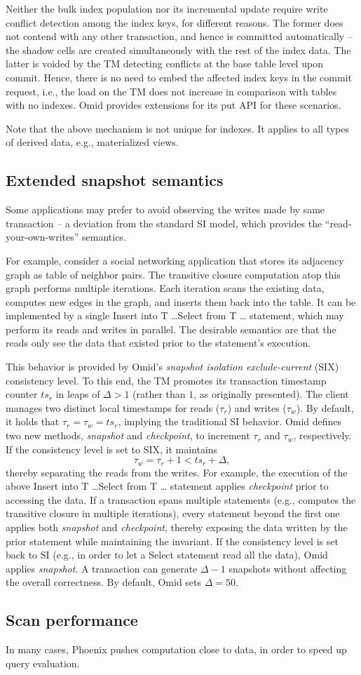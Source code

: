 Neither the bulk index population nor its incremental update require write conflict detection 
among the index keys, for different reasons. The former does not contend with any other 
transaction, and hence is committed automatically -- the shadow cells are created simultaneously
with the rest of the index data. The latter is voided by the TM detecting conflicts at the base 
table level upon commit. Hence, there is no need to embed the affected index keys in the commit 
request, i.e., the load on the TM does not increase in comparison with tables with no indexes. 
Omid provides extensions for its put API for these scenarios. 

Note that the above mechanism is not unique for indexes. It applies to all types of derived data, 
e.g., materialized views. 

\subsection{Extended snapshot semantics}

Some applications may prefer to avoid observing the writes made by same transaction --
a deviation from the standard SI model, which provides the ``read-your-own-writes'' 
semantics. 

For example, consider a social networking application that stores its adjacency graph 
as table of neighbor pairs. The transitive closure computation atop this graph performs
multiple iterations. Each iteration scans the existing data, computes new edges in the 
graph, and inserts them back into the table. It can be implemented by a single 
{\sc Insert into T \ldots Select from T \ldots \/} statement, which may perform its reads and writes in parallel. 
The desirable semantics are that the reads only see the data that existed prior to the 
statement's execution. 

This behavior is provided by Omid's {\em snapshot isolation exclude-current} (SIX) 
consistency level. To this end, the TM promotes its transaction timestamp counter $ts_r$ 
in leaps of $\Delta > 1$ (rather than $1$, as originally presented).  The client manages 
two distinct local timestamps for reads ($\tau_r$) and writes ($\tau_w$). By default, 
it holds that  $\tau_r = \tau_w = ts_r$, implying the traditional SI behavior. Omid 
defines two new methods, {\em snapshot\/} and {\em checkpoint}, to increment 
$\tau_r$ and $\tau_w$, respectively. If the consistency level is set to SIX, 
it maintains 
\[
\tau_w = \tau_r+1 < ts_r+\Delta,
\]
thereby separating the reads from the writes. For example, the execution of 
the above {\sc Insert into T \ldots Select from T \ldots \/} statement applies 
{\em checkpoint\/} prior to accessing the data. If a transaction spans multiple 
statements (e.g., computes the transitive closure in multiple iterations), 
every statement beyond the first one applies both {\em snapshot\/} 
and {\em checkpoint}, thereby exposing the data written by the prior 
statement while maintaining the invariant. If the consistency level is
set back to SI (e.g., in order to let a {\sc Select\/} statement read all 
the data), Omid applies {\em snapshot\/}.  
A transaction can generate $\Delta-1$ snapshots without affecting 
the overall correctness. By default, Omid sets $\Delta=50$.  

\subsection{Scan performance} In many cases, Phoenix pushes computation close to data, in order
to speed up query evaluation.
